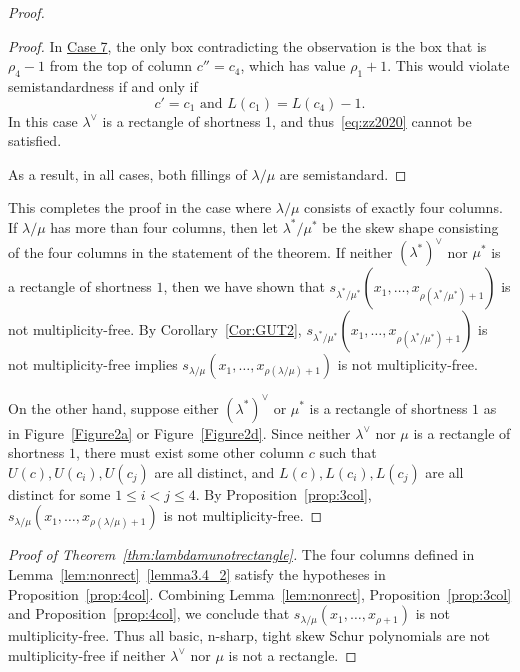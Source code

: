 \documentclass[10pt]{article}
\theoremstyle{definition}
\let\hyperlinka\hyperlink %
\begin{document}
\begin{proof}
\begin{proof}
In \hyperlinka{prop3.7case_7}{Case 7}, the only box contradicting the observation is the box that is $\rho_4-1$ from the top of column $c''=c_4$, which has value $\rho_1+1$. This would violate semistandardness if and only if
\begin{equation}
\label{eq:zz2020}
c'=c_1\text{ and }L(c_1) = L(c_4)-1.
\end{equation}
In this case $\lambda^\vee$ is a rectangle of shortness 1, and thus~\eqref{eq:zz2020} cannot be satisfied.

As a result, in all cases, both fillings of $\lambda/\mu$ are semistandard.
\end{proof}

This completes the proof in the case where $\lambda/\mu$ consists of exactly four columns. If $\lambda/\mu$ has more than four columns, then let $\lambda^*/\mu^*$ be the skew shape consisting of the four columns in the statement of the theorem. If neither $(\lambda^*)^\vee$ nor $\mu^*$ is a rectangle of shortness $1$, then we have shown that $s_{\lambda^*/\mu^*}(x_1,\dots, x_{\rho(\lambda^*/\mu^*) + 1})$ is not multiplicity-free. By Corollary~\ref{Cor:GUT2}, $s_{\lambda^*/\mu^*}(x_1,\dots, x_{\rho(\lambda^*/\mu^*) + 1})$ is not multiplicity-free implies $s_{\lambda/\mu}(x_1,\dots, x_{\rho(\lambda/\mu) + 1})$ is not multiplicity-free.

On the other hand, suppose either $(\lambda^*)^\vee$ or $\mu^*$ is a rectangle of shortness $1$ as in Figure~\ref{Figure2a} or Figure~\ref{Figure2d}. Since neither $\lambda^\vee$ nor $\mu$ is a rectangle of shortness $1$, there must exist some other column $c$ such that $U(c),U(c_i),U(c_j)$ are all distinct, and $L(c),L(c_i),L(c_j)$ are all distinct for some $1\leq i<j\leq 4$. By Proposition~\ref{prop:3col}, $s_{\lambda/\mu}(x_1,\dots, x_{\rho(\lambda/\mu)+1})$ is not multiplicity-free.
\end{proof}

\begin{proof}[Proof of Theorem~\ref{thm:lambdamunotrectangle}] 
The four columns defined in Lemma~\ref{lem:nonrect}~\ref{lemma3.4_2} satisfy the hypotheses in Proposition~\ref{prop:4col}. Combining Lemma~\ref{lem:nonrect}, Proposition~\ref{prop:3col} and Proposition~\ref{prop:4col}, we conclude that $s_{\lambda/\mu}(x_1,\ldots,x_{\rho+1})$ is not multiplicity-free. Thus all basic, n-sharp, tight skew Schur polynomials are not multiplicity-free if neither $\lambda^\vee$ nor $\mu$ is not a rectangle.
\end{proof}
\end{document}
